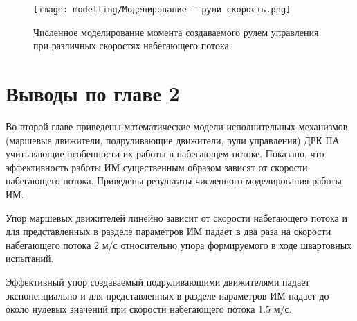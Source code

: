 \begin{figure}[ht]
    \centering
    \texttt{[image: modelling/Моделирование - рули скорость.png]}
    \caption{Численное моделирование момента создаваемого рулем управления при различных скоростях набегающего потока.}
    \label{fig:modelling-rudder-velocity}
\end{figure}

\section{Выводы по главе 2}
Во второй главе приведены математические модели исполнительных механизмов (маршевые движители, подруливающие движители, рули управления) ДРК ПА учитывающие особенности их работы в набегающем потоке.
Показано, что эффективность работы ИМ существенным образом зависят от скорости набегающего потока. 
Приведены результаты численного моделирования работы ИМ.

Упор маршевых движителей линейно зависит от скорости набегающего потока и для представленных в разделе параметров ИМ падает в два раза на скорости набегающего потока 2 м/с относительно упора формируемого в ходе швартовных испытаний.

Эффективный упор создаваемый подруливающими движителями падает экспоненциально и для представленных в разделе параметров ИМ падает до около нулевых значений при скорости набегающего потока 1.5 м/с.